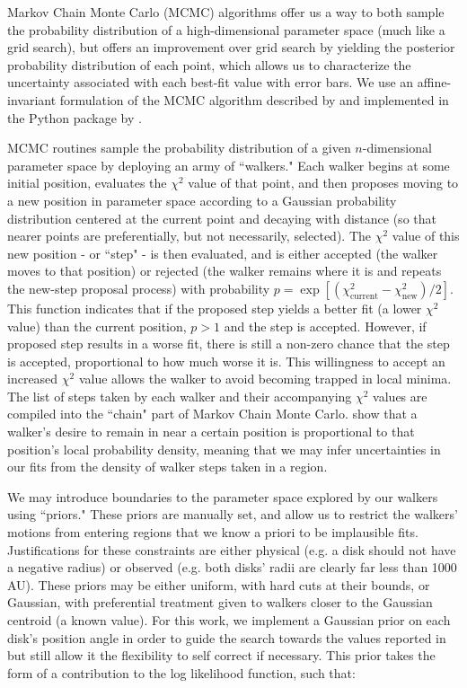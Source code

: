 Markov Chain Monte Carlo (MCMC) algorithms offer us a way to both sample the probability distribution of a high-dimensional parameter space (much like a grid search), but offers an improvement over grid search by yielding the posterior probability distribution of each point, which allows us to characterize the uncertainty associated with each best-fit value with error bars. We use an affine-invariant formulation of the MCMC algorithm described by \citet{Goodman2010} and implemented in the Python package  by \citet{ForemanMackey2013}.

MCMC routines sample the probability distribution of a given $n$-dimensional parameter space by deploying an army of ``walkers." Each walker begins at some initial position, evaluates the $\chi^2$ value of that point, and then proposes moving to a new position in parameter space according to a Gaussian probability distribution centered at the current point and decaying with distance (so that nearer points are preferentially, but not necessarily, selected). The $\chi^2$ value of this new position - or ``step" - is then evaluated, and is either accepted (the walker moves to that position) or rejected (the walker remains where it is and repeats the new-step proposal process) with probability $p = \exp \left[ (\chi_\text{current}^2 - \chi_\text{new}^2)/2 \right]$. This function indicates that if the proposed step yields a better fit (a lower $\chi^2$ value) than the current position, $p > 1$ and the step is accepted. However, if proposed step results in a worse fit, there is still a non-zero chance that the step is accepted, proportional to how much worse it is. This willingness to accept an increased $\chi^2$ value allows the walker to avoid becoming trapped in local minima. The list of steps taken by each walker and their accompanying $\chi^2$ values are compiled into the ``chain" part of Markov Chain Monte Carlo. \citet{Goodman2010} show that a walker's desire to remain in near a certain position is proportional to that position's local probability density, meaning that we may infer uncertainties in our fits from the density of walker steps taken in a region.

We may introduce boundaries to the parameter space explored by our walkers using ``priors." These priors are manually set, and allow us to restrict the walkers' motions from entering regions that we know a priori to be implausible fits. Justifications for these constraints are either physical (e.g. a disk should not have a negative radius) or observed (e.g. both disks' radii are clearly far less than 1000 AU). These priors may be either uniform, with hard cuts at their bounds, or Gaussian, with preferential treatment given to walkers closer to the Gaussian centroid (a known value). For this work, we implement a Gaussian prior on each disk's position angle in order to guide the search towards the values reported in \citet{Williams2014} but still allow it the flexibility to self correct if necessary. This prior takes the form of a contribution to the log likelihood function, such that:

